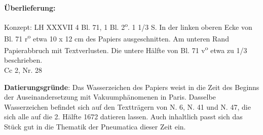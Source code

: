       
               
                \begin{ledgroupsized}[r]{120mm}
                \footnotesize 
                \pstart                
                \noindent\textbf{\"{U}berlieferung:}   
                \pend
                \end{ledgroupsized}
            
              
                            \begin{ledgroupsized}[r]{114mm}
                            \footnotesize 
                            \pstart \parindent -6mm
                            Konzept: LH XXXVII 4 Bl. 71, 1 Bl. 2\textsuperscript{o}. 1 1/3 S. In der linken oberen Ecke von Bl. 71 r\textsuperscript{o} etwa 10 x 12 cm des Papiers ausgeschnitten. Am unteren Rand Papierabbruch mit Textverlusten. Die untere H\"{a}lfte von Bl. 71 v\textsuperscript{o} etwa zu 1/3 beschrieben.\\Cc 2, Nr. 28 \pend
                            \end{ledgroupsized}
                \vspace*{5mm}
                \begin{ledgroup}
                \footnotesize 
                \pstart{}
            \noindent\footnotesize{\textbf{Datierungsgr\"{u}nde}: Das Wasserzeichen des Papiers weist in die Zeit des Beginns der Auseinandersetzung mit Vakuumph\"{a}nomenen in Paris. Dasselbe Wasserzeichen befindet sich auf den Texttr\"{a}gern von N. 6, N. 41 und N. 47, die sich alle auf die 2. H\"{a}lfte 1672 datieren lassen. Auch inhaltlich passt sich das St\"{u}ck gut in die Thematik der Pneumatica dieser Zeit ein.}
                \pend
                \end{ledgroup}
            
